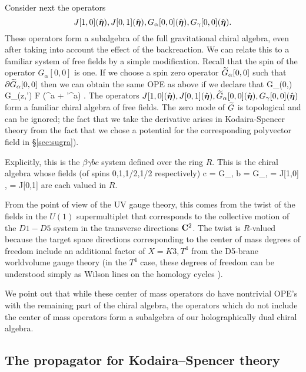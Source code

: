 \documentclass[../main.tex]{subfiles}
\begin{document}
Consider next the operators 
\[
J[1,0](\Hat {\boldsymbol\eta}), J[0,1](\Hat {\boldsymbol\eta}),G_\alpha[0,0](\Hat {\boldsymbol\eta}), G_\gamma[0,0](\Hat {\boldsymbol\eta}) .
\]
These operators form a subalgebra of the full gravitational chiral algebra, even after taking into account the effect of the backreaction.
We can relate this to a familiar system of free fields by a simple modification.
Recall that the spin of the operator $G_\alpha[0,0]$ is one.
If we choose a spin zero operator $\widetilde G_{\alpha}[0,0]$ such that $\partial \widetilde G_\alpha [0,0]$ then we can obtain the same OPE as above if we declare that 
\beqn
\til G_\alpha[0,0](0,\what \bfeta) G_\gamma[0,0](z,\what \bfeta') \simeq {} \what F (\what \bfeta^a + \what \bfeta'^a) .
\eeqn
The operators $J[1,0](\Hat {\boldsymbol\eta}), J[0,1](\Hat {\boldsymbol\eta}),\widetilde G_\alpha[0,0](\Hat {\boldsymbol\eta}), G_\gamma[0,0](\Hat {\boldsymbol\eta})$ form a familiar chiral algebra of free fields. 
The zero mode of $\widetilde G$ is topological and can be ignored; the fact that we take the derivative arises in Kodaira-Spencer theory from the fact that we chose a potential for the corresponding polyvector field in \S \ref{sec:sugra}).

Explicitly, this is the $\beta \gamma bc$ system defined over the ring $R$. 
This is the chiral algebra whose fields (of spins 0,1,1/2,1/2 respectively)
\beqn
c = \til G_\alpha[0,0], b = G_\gamma [0,0], \beta = J[1,0] , \gamma = J[0,1]
\eeqn
are each valued in $R$.

From the point of view of the UV gauge theory, this comes from the twist of the fields in the $U(1)$ supermultiplet that corresponds to the collective motion of the $D1-D5$ system in the transverse directions $\mathbf{C}^2$. The twist is $R$-valued because the target space directions corresponding to the center of mass degrees of freedom include an additional factor of $X =K3, T^4$ from the D5-brane worldvolume gauge theory (in the $T^4$ case, these degrees of freedom can be understood simply as Wilson lines on the homology cycles \cite{Davidetal}).

We point out that while these center of mass operators do have nontrivial OPE's with the remaining part of the chiral algebra, the operators which do not include the center of mass operators form a subalgebra of our holographically dual chiral algebra.

\subsection{The propagator for Kodaira--Spencer theory}
\end{document}
